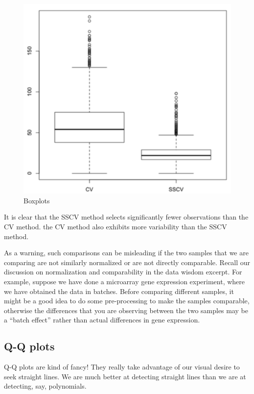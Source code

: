 \begin{figure}[H]
\begin{center}
\includegraphics[scale=0.5]{boxplot.png}
\end{center}
\caption{Boxplots}
\label{fig:boxplot}
\end{figure}

It is clear that the SSCV method selects significantly fewer observations than the CV method. the CV method also exhibits more variability than the SSCV method.

As a warning, such comparisons can be misleading if the two samples that we are comparing are not similarly normalized or are not directly comparable. Recall our discussion on normalization and comparability in the data wisdom excerpt. For example, suppose we have done a microarray gene expression experiment, where we have obtained the data in batches. Before comparing different samples, it might be a good idea to do some pre-processing to make the samples comparable, otherwise the differences that you are observing between the two samples may be a ``batch effect'' rather than actual differences in gene expression.

\subsection*{Q-Q plots}

Q-Q plots are kind of fancy! They really take advantage of our visual desire to seek straight lines. We are much better at detecting straight lines than we are at detecting, say, polynomials.

